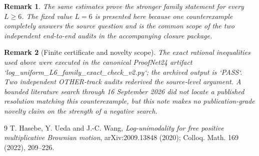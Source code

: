 \documentclass[11pt]{article}
\newtheorem{remark}{Remark}
\begin{document}
\begin{remark}
The same estimates prove the stronger family statement for every $L\geq6$.
The fixed value $L=6$ is presented here because one counterexample completely
answers the source question and is the common scope of the two independent
end-to-end audits in the accompanying closure package.
\end{remark}

\begin{remark}[Finite certificate and novelty scope]
The exact rational inequalities used above were executed in the canonical
ProofNet24 artifact `log\_uniform\_L6\_family\_exact\_check\_v2.py`; the archived
output is `PASS`.  Two independent OTHER-track audits rederived the source-level
argument.  A bounded literature search through 16 September 2026 did not locate
a published resolution matching this counterexample, but this note makes no
publication-grade novelty claim on the strength of a negative search.
\end{remark}

\begin{thebibliography}{9}
T. Hasebe, Y. Ueda and J.-C. Wang,
\emph{Log-unimodality for free positive multiplicative Brownian motion},
arXiv:2009.13848 (2020); Colloq. Math. 169 (2022), 209--226.
\end{thebibliography}
\end{document}
